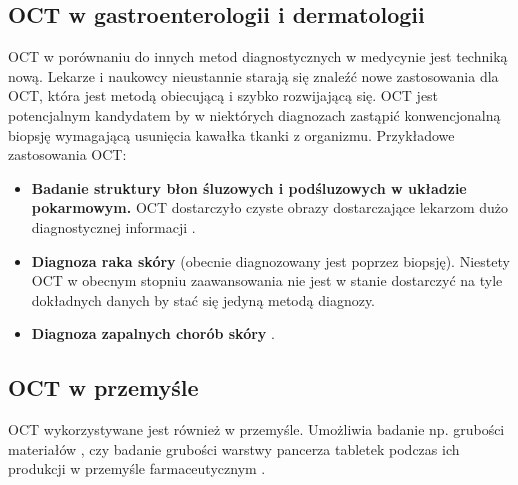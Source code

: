 \subsection{OCT w gastroenterologii i dermatologii}

OCT w porównaniu do innych metod diagnostycznych w medycynie jest techniką nową. Lekarze i naukowcy nieustannie starają się znaleźć nowe zastosowania dla OCT, która jest metodą obiecującą i szybko rozwijającą się. OCT jest potencjalnym kandydatem by w niektórych diagnozach zastąpić konwencjonalną biopsję wymagającą usunięcia kawałka tkanki z organizmu. Przykładowe zastosowania OCT:

\begin{itemize}
\item \textbf{Badanie struktury błon śluzowych i podśluzowych w układzie pokarmowym.} OCT dostarczyło czyste obrazy dostarczające lekarzom dużo diagnostycznej informacji \cite{Rollins:99}.
\item \textbf{Diagnoza raka skóry} (obecnie diagnozowany jest poprzez biopsję). Niestety OCT w obecnym stopniu zaawansowania nie jest w stanie dostarczyć na tyle dokładnych danych by stać się jedyną metodą diagnozy.
\item \textbf{Diagnoza zapalnych chorób skóry} \cite{Welzel01}.
\end{itemize}

\subsection{OCT w przemyśle}

OCT wykorzystywane jest również w przemyśle. Umożliwia badanie np. grubości materiałów \cite{walecki2006determining}, czy badanie grubości warstwy pancerza tabletek podczas ich produkcji w przemyśle farmaceutycznym \cite{markl2014device}.
